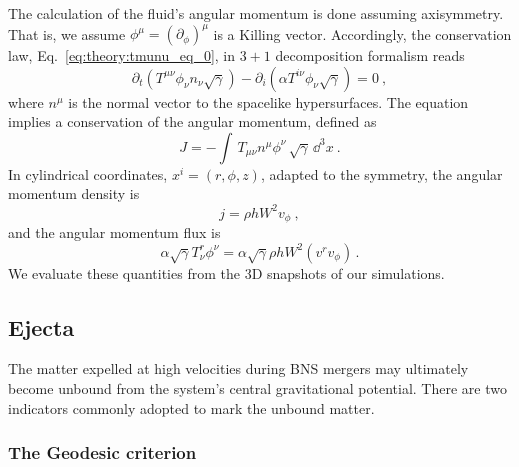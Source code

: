 The calculation of the fluid's angular momentum is done assuming axisymmetry.
That is, we assume $\phi^{\mu} = (\partial_{\phi})^{\mu}$ is a Killing
vector. 
Accordingly, the conservation law, Eq.~\eqref{eq:theory:tmunu_eq_0}, 
in $3+1$ decomposition formalism reads
%
\begin{equation}
\partial_t(T^{\mu\nu}\phi_{\nu}n_{\nu}\sqrt{\gamma}) -
\partial_i(\alpha T^{i \nu}\phi_{\nu}\sqrt{\gamma}) = 0 \ ,
\end{equation}
%
where $n^\mu$ is the normal vector to the spacelike hypersurfaces.
%
The equation implies a conservation of the angular momentum, 
defined as 
\begin{equation}
J = %
-\int \,
T_{\mu\nu}n^{\mu}\phi^{\nu}\,\sqrt{\gamma}\, \dd^3 x\ .
\end{equation}
%
In cylindrical coordinates, $x^i=(r,\phi,z)$, adapted to the symmetry, 
the angular momentum density is  
%
\begin{equation}
j = %
\rho h W^2 v_{\phi} \ ,
\label{eq:method:ang_mom}
\end{equation}
%
and the angular momentum flux is 
%
\begin{equation}
\alpha\sqrt{\gamma}T^r _{\nu}\phi^{\nu} =
\alpha\sqrt{\gamma}\rho h W^2 (v^{r}v_{\phi})\, .
\end{equation}
%
We evaluate these quantities from the $3$D snapshots of our simulations.




\subsection{Ejecta} \label{sec:bns_sims:method:ejecta}

The matter expelled at high velocities during \ac{BNS} mergers 
may ultimately become unbound from the system's   
central gravitational potential. 
There are two indicators commonly adopted to mark the unbound matter.

\subsubsection{The Geodesic criterion}

